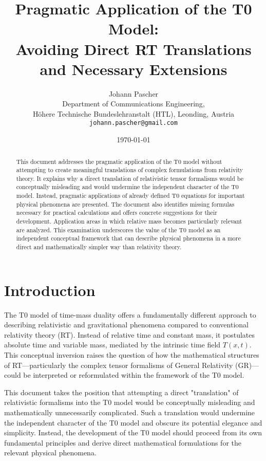 \documentclass[12pt,a4paper]{article}
\newcommand{\Tfieldt}{T(x,t)}
\begin{document}
	
	\title{Pragmatic Application of the T0 Model:\\Avoiding Direct RT Translations and Necessary Extensions}
	\author{Johann Pascher\\
		Department of Communications Engineering, \\Höhere Technische Bundeslehranstalt (HTL), Leonding, Austria\\
		\texttt{johann.pascher@gmail.com}}
	\date{\today}
	
	\maketitle
	
	\begin{abstract}
		This document addresses the pragmatic application of the T0 model without attempting to create meaningful translations of complex formulations from relativity theory. It explains why a direct translation of relativistic tensor formalisms would be conceptually misleading and would undermine the independent character of the T0 model. Instead, pragmatic applications of already defined T0 equations for important physical phenomena are presented. The document also identifies missing formulas necessary for practical calculations and offers concrete suggestions for their development. Application areas in which relative mass becomes particularly relevant are analyzed. This examination underscores the value of the T0 model as an independent conceptual framework that can describe physical phenomena in a more direct and mathematically simpler way than relativity theory.
	\end{abstract}
	\newpage
	\tableofcontents
	\newpage
	\section{Introduction}
	\label{sec:introduction}
	
	The T0 model of time-mass duality offers a fundamentally different approach to describing relativistic and gravitational phenomena compared to conventional relativity theory (RT). Instead of relative time and constant mass, it postulates absolute time and variable mass, mediated by the intrinsic time field $\Tfieldt$. This conceptual inversion raises the question of how the mathematical structures of RT—particularly the complex tensor formalisms of General Relativity (GR)—could be interpreted or reformulated within the framework of the T0 model.
	
	This document takes the position that attempting a direct "translation" of relativistic formalisms into the T0 model would be conceptually misleading and mathematically unnecessarily complicated. Such a translation would undermine the independent character of the T0 model and obscure its potential elegance and simplicity. Instead, the development of the T0 model should proceed from its own fundamental principles and derive direct mathematical formulations for the relevant physical phenomena.
	
\end{document}
